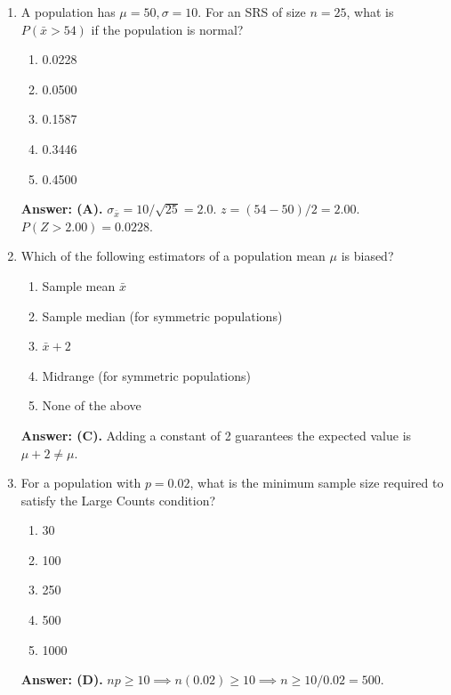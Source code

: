 \begin{enumerate}[leftmargin=1.5em]
  \item A population has $\mu = 50, \sigma = 10$. For an SRS of size $n = 25$, what is $P(\bar{x} > 54)$ if the population is normal?
  \begin{enumerate}[label=(\Alph*)]
    \item 0.0228 \item 0.0500 \item 0.1587 \item 0.3446 \item 0.4500
  \end{enumerate}
  \textbf{Answer: (A).} $\sigma_{\bar{x}} = 10/\sqrt{25} = 2.0$. $z = (54 - 50)/2 = 2.00$. $P(Z > 2.00) = 0.0228$.

  \item Which of the following estimators of a population mean $\mu$ is biased?
  \begin{enumerate}[label=(\Alph*)]
    \item Sample mean $\bar{x}$ \item Sample median (for symmetric populations) \item $\bar{x} + 2$ \item Midrange (for symmetric populations) \item None of the above
  \end{enumerate}
  \textbf{Answer: (C).} Adding a constant of 2 guarantees the expected value is $\mu + 2 \neq \mu$.

  \item For a population with $p = 0.02$, what is the minimum sample size required to satisfy the Large Counts condition?
  \begin{enumerate}[label=(\Alph*)]
    \item 30 \item 100 \item 250 \item 500 \item 1000
  \end{enumerate}
  \textbf{Answer: (D).} $np \ge 10 \implies n(0.02) \ge 10 \implies n \ge 10 / 0.02 = 500$.
\end{enumerate}

